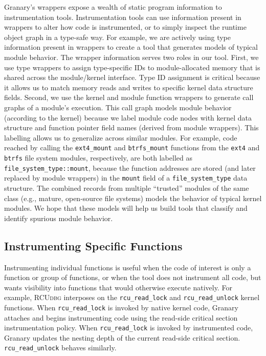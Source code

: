 \documentclass[preprint]{sigplanconf}
\newcommand{\toolname}[1]{{\scshape #1}}
\begin{document}
Granary's wrappers expose a wealth of static program information to instrumentation tools. Instrumentation tools can use information present in wrappers to alter how code is instrumented, or to simply inspect the runtime object graph in a type-safe way. For example, we are actively using type information present in wrappers to create a tool that generates models of typical module behavior. The wrapper information serves two roles in our tool. First, we use type wrappers to assign type-specific IDs to module-allocated memory that is shared across the module/kernel interface. Type ID assignment is critical because it allows us to match memory reads and writes to specific kernel data structure fields. Second, we use the kernel and module function wrappers to generate call graphs of a module's execution. This call graph models module behavior (according to the kernel) because we label module code nodes with kernel data structure and function pointer field names (derived from module wrappers). This labelling allows us to generalize across similar modules. For example, code reached by calling the \texttt{ext4\_mount} and \texttt{btrfs\_mount} functions from the \texttt{ext4} and \texttt{btrfs} file system modules, respectively, are both labelled as \texttt{file\_system\_type::mount}, because the function addresses are stored (and later replaced by module wrappers) in the \texttt{mount} field of a \texttt{file\_system\_type} data structure. The combined records from multiple ``trusted'' modules of the same class (e.g., mature, open-source file systems) models the behavior of typical kernel modules. We hope that these models will help us build tools that classify and identify spurious module behavior. 

\subsection{Instrumenting Specific Functions}\label{sec:function_wrapper}

Instrumenting individual functions is useful when the code of interest is only a function or group of functions, or when the tool does not instrument all code, but wants visibility into functions that would otherwise execute natively. For example, \toolname{RCUdbg} interposes on the \texttt{rcu\_\linebreak[0]read\_\linebreak[0]lock} and \texttt{rcu\_\linebreak[0]read\_\linebreak[0]unlock} kernel functions. When \texttt{rcu\_\linebreak[0]read\_\linebreak[0]lock} is invoked by native kernel code, Granary attaches and begins instrumenting code using the read-side critical section instrumentation policy. When \texttt{rcu\_\linebreak[0]read\_\linebreak[0]lock} is invoked by instrumented code, Granary updates the nesting depth of the current read-side critical section. \texttt{rcu\_\linebreak[0]read\_\linebreak[0]unlock} behaves similarly.
\end{document}
